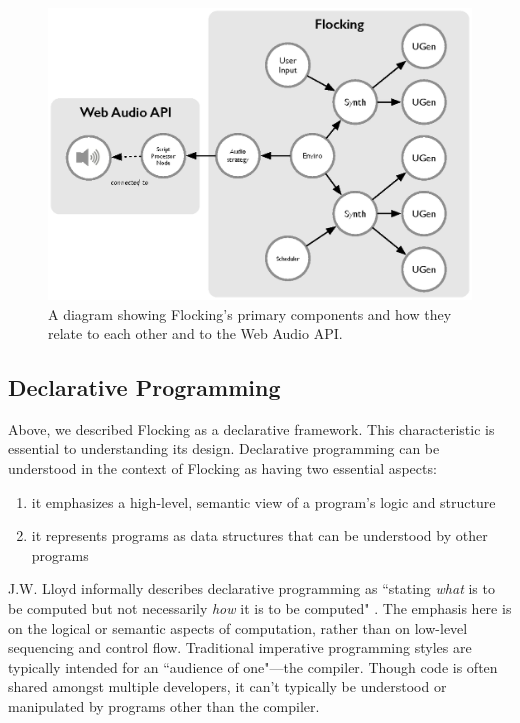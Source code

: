 \documentclass{article}
\begin{document}
\begin{figure}[h]
\centering
\includegraphics[width=0.9\columnwidth]{images/flocking-component-architecture.eps}
\caption{ A diagram showing Flocking's primary components and how they relate to each other and to the Web Audio API.\label{fig:architecture}}
\end{figure}

\subsection{Declarative Programming}

Above, we described Flocking as a declarative framework. This characteristic is essential to understanding its design. Declarative programming can be understood in the context of Flocking as having two essential aspects:

\begin{enumerate}
\item it emphasizes a high-level, semantic view of a program's logic and structure
\item it represents programs as data structures that can be understood by other programs
\end{enumerate}

J.W. Lloyd informally describes declarative programming as ``stating {\it what} is to be computed but not necessarily {\it how} it is to be computed" \cite{lloyd1994practical}. The emphasis here is on the logical or semantic aspects of computation, rather than on low-level sequencing and control flow. Traditional imperative programming styles are typically intended for an ``audience of one"---the compiler. Though code is often shared amongst multiple developers, it can't typically be understood or manipulated by programs other than the compiler.
\end{document}

